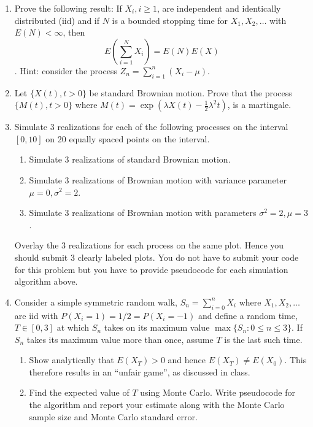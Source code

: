 \documentclass{article}
\begin{document}
\begin{enumerate}
\item Prove the following result: If $X_i, i\geq 1$, are independent
  and identically distributed (iid) %
  and if $N$ is a bounded stopping time for $X_1,X_2,\dots$ with
  $E(N)< \infty$, then $$ E\left(\sum_{i=1}^N X_i\right) =
  E(N)E(X)$$. Hint: consider the process $Z_n=\sum_{i=1}^n (X_i -
  \mu)$.

\item Let $\{X(t), t>0\}$ be standard Brownian motion. Prove that the
  process $\{M(t), t>0\}$ where $M(t) = \exp\left(\lambda X(t) -
    \frac{1}{2} \lambda^2 t\right)$, is a martingale.

\item Simulate 3 realizations for each of the following processes on
  the interval $[0,10]$ on 20 equally spaced points on the interval.
\begin{enumerate}
\item Simulate 3 realizations of standard Brownian motion. 
\item Simulate 3 realizations of Brownian motion with variance parameter
  $\mu=0, \sigma^2=2$. 
\item Simulate 3 realizations of Brownian motion with parameters $\sigma^2=2, \mu=3$.
\end{enumerate}
Overlay the 3 realizations for each process on the same plot. Hence
you should submit 3 clearly labeled plots. You do not have to submit
your code for this problem but you have to provide pseudocode for each
 simulation algorithm above.

\item Consider a simple symmetric random walk, $S_n=\sum_{i=0}^n X_i$
  where $X_1,X_2,\dots$ are iid with $P(X_i=1)=1/2=P(X_i=-1)$ and
  define a random time, $T\in [0,3]$ at which ${S_n}$ takes on
  its maximum value $\max\{S_n : 0 \leq n \leq 3\}$. If ${S_n}$ takes its maximum
  value more than once, assume $T$ is the last such time. 
\begin{enumerate}
\item Show analytically that $E(X_T)>0$ and hence $E(X_T) \neq E(X_0)$. This
  therefore results in an ``unfair game'', as discussed in class. 
\item Find the expected value of $T$ using Monte Carlo. Write
  pseudocode for the algorithm and report your estimate along with the
  Monte Carlo sample size and Monte Carlo standard error.
\end{enumerate}

\end{enumerate}
\end{document}
